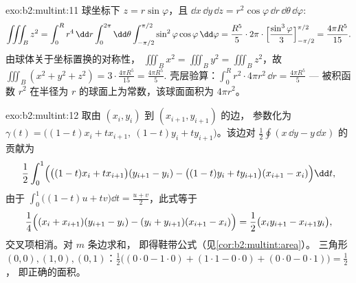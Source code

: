 \begin{solution}{exo:b2:multint:11}
球坐标下 $z = r\sin\varphi$，且 $\dd x\,\dd
y\,\dd z = r^2\cos\varphi\,\dd r\,\dd\theta\,\dd\varphi$:
\[
\iiint_B z^2
= \int_0^R r^4\,\dd r\int_0^{2\pi}\dd\theta
\int_{-\pi/2}^{\pi/2}\sin^2\varphi\cos\varphi\,\dd\varphi
= \frac{R^5}5\cdot2\pi\cdot
\Bigl[\frac{\sin^3\varphi}3\Bigr]_{-\pi/2}^{\pi/2}
= \frac{4\pi R^5}{15}.
\]
由球体关于坐标置换的对称性，
$\iiint_B x^2 = \iiint_B y^2 = \iiint_B z^2$，故 $\iiint_B(x^2
+ y^2 + z^2) = 3\cdot\frac{4\pi R^5}{15} = \frac{4\pi R^5}5$.
壳层验算：$\int_0^R r^2\cdot 4\pi r^2\,\dd r = \frac{4\pi
R^5}5$ --- 被积函数 $r^2$ 在半径为
$r$ 的球面上为常数，该球面面积为 $4\pi r^2$。
\end{solution}

\begin{solution}{exo:b2:multint:12}
取由 $(x_i, y_i)$ 到 $(x_{i+1}, y_{i+1})$ 的边，
参数化为 $\gamma(t) = \bigl((1-t)x_i + tx_{i+1},\ (1-t)y_i +
ty_{i+1}\bigr)$。该边对
$\frac12\oint(x\,\dd y - y\,\dd x)$ 的贡献为
\[
\frac12\int_0^1\Bigl(\bigl((1-t)x_i +
tx_{i+1}\bigr)(y_{i+1} - y_i) - \bigl((1-t)y_i +
ty_{i+1}\bigr)(x_{i+1} - x_i)\Bigr)\dd t ,
\]
由于 $\int_0^1\bigl((1-t)u + tv\bigr)\dd t = \frac{u +
v}2$，此式等于
\[
\frac14\Bigl((x_i + x_{i+1})(y_{i+1} - y_i) - (y_i +
y_{i+1})(x_{i+1} - x_i)\Bigr)
= \frac12\bigl(x_iy_{i+1} - x_{i+1}y_i\bigr),
\]
交叉项相消。对 $m$ 条边求和，
即得鞋带公式（见\cref{cor:b2:multint:area}）。
三角形 $(0,0), (1,0), (0,1)$：$\frac12\bigl((0\cdot0 - 1\cdot0) +
(1\cdot1 - 0\cdot0) + (0\cdot0 - 0\cdot1)\bigr) = \frac12$，
即正确的面积。
\end{solution}

